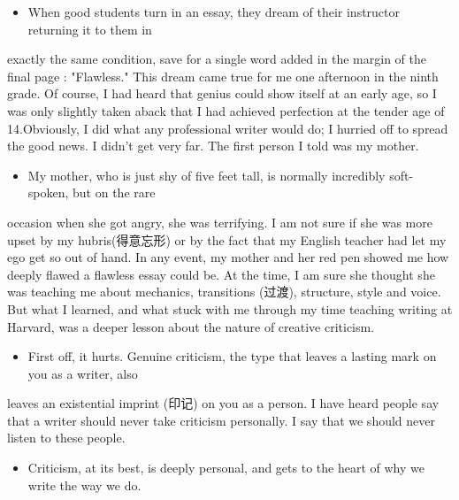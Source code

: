 \documentclass[UTF8,11pt]{ctexart}
\begin{document}
\begin{itemize}[leftmargin=2em,itemsep=.2em,topsep=.4em]\item[B.] When good students turn in an essay, they dream of their instructor returning it to them in
\end{itemize}

exactly the same condition, save for a single word added in the margin of the final page : "Flawless." This dream came true for me one afternoon in the ninth grade. Of course, I had heard that genius could show itself at an early age, so I was only slightly taken aback that I had achieved perfection at the tender age of 14.Obviously, I did what any professional writer would do; I hurried off to spread the good news. I didn't get very far. The first person I told was my mother.


\begin{itemize}[leftmargin=2em,itemsep=.2em,topsep=.4em]\item[C.] My mother, who is just shy of five feet tall, is normally incredibly soft-spoken, but on the rare
\end{itemize}

occasion when she got angry, she was terrifying. I am not sure if she was more upset by my hubris(得意忘形) or by the fact that my English teacher had let my ego get so out of hand. In any event, my mother and her red pen showed me how deeply flawed a flawless essay could be. At the time, I am sure she thought she was teaching me about mechanics, transitions (过渡), structure, style and voice. But what I learned, and what stuck with me through my time teaching writing at Harvard, was a deeper lesson about the nature of creative criticism.


\begin{itemize}[leftmargin=2em,itemsep=.2em,topsep=.4em]\item[D.] First off, it hurts. Genuine criticism, the type that leaves a lasting mark on you as a writer, also
\end{itemize}

leaves an existential imprint (印记) on you as a person. I have heard people say that a writer should never take criticism personally. I say that we should never listen to these people.


\begin{itemize}[leftmargin=2em,itemsep=.2em,topsep=.4em]\item[E.] Criticism, at its best, is deeply personal, and gets to the heart of why we write the way we do.
\end{itemize}
\end{document}
